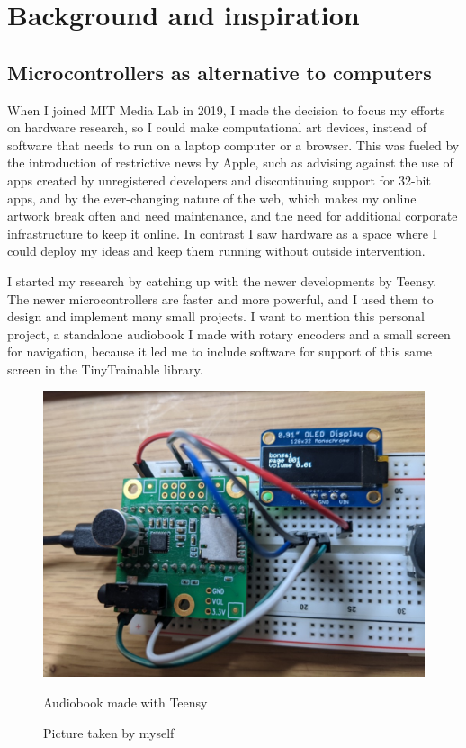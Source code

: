 \chapter{Background and inspiration}

\section{Microcontrollers as alternative to computers}

When I joined MIT Media Lab in 2019, I made the decision to focus my efforts on hardware research, so I could make computational art devices, instead of software that needs to run on a laptop computer or a browser. This was fueled by the introduction of restrictive news by Apple, such as advising against the use of apps created by unregistered developers and discontinuing support for 32-bit apps, and by the ever-changing nature of the web, which makes my online artwork break often and need maintenance, and the need for additional corporate infrastructure to keep it online. In contrast I saw hardware as a space where I could deploy my ideas and keep them running without outside intervention.

I started my research by catching up with the newer developments by Teensy. The newer microcontrollers are faster and more powerful, and I used them to design and implement many small projects. I want to mention this personal project, a standalone audiobook I made with rotary encoders and a small screen for navigation, because it led me to include software for support of this same screen in the TinyTrainable library.

\begin{figure}[ht]
  \centering
  \includegraphics[width=0.75\linewidth,height=0.40\textheight,keepaspectratio]{images/bonsai.jpg}
  \caption{Audiobook made with Teensy}
  \caption*{Picture taken by myself}
  \label{fig:bonsai-audiobook}
\end{figure}

